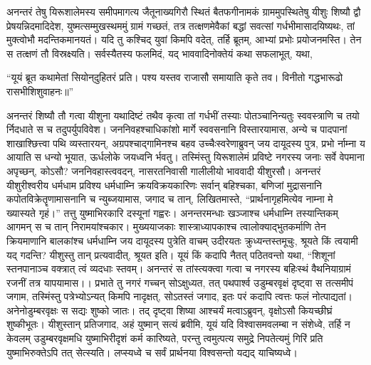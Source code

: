 \adhyAya
{}
\vakya अनन्तरं तेषु यिरूशालेमस्य समीपमागत्य जैतूनाख्यगिरौ स्थितं बैतफगीनामकं ग्राममुपस्थितेषु यीशुः शिष्यौ द्वौ प्रेषयन्निदमादिदेश,
\vakya युष्मत्सम्मुखस्थममुं ग्रामं गच्छतं, तत्र तत्क्षणमेवैकां बद्धां सवत्सां गर्धभीमासादयिष्यथः, तां मुक्त्वोभौ मदन्तिकमानयतं।
\vakya यदि तु कश्चिद् युवां किमपि वदेत्, तर्हि ब्रूतम्, आभ्यां प्रभोः प्रयोजनमस्ति। तेन स तत्क्षणं तौ विस्रक्ष्यति।
\vakya सर्वस्यैतस्य फलमिदं, यद् भाववादिनोक्तेयं कथा सफलाभूत्, यथा,
\begin{poem}
\startwithvakya “यूयं ब्रूत कथामेतां सियोन्‌दुहितरं प्रति।
\pline पश्य यस्तव राजासौ समायाति कृते तव।
\pline विनीतो गद्धभारूढो रासभीशिशुवाहनः॥”
\end{poem}
\vakya अनन्तरं शिष्यौ तौ गत्वा यीशुना यथादिष्टं तथैव कृत्वा
\vakya तां गर्धभीं तस्याः पोतञ्चानिन्यतुः स्ववस्त्राणि च तयो र्निदधाते स च तदुपर्युपविवेश।
\vakya जननिवहश्चाधिकांशो मार्गे स्ववसनानि विस्तारयामास, अन्ये च पादपानां शाखाश्छित्त्वा पथि व्यस्तारयन्,
\vakya अग्रपश्चाद्गामिनश्च बहव उच्चैःस्वरेणाब्रुवन् जय दायूदस्य पुत्र, प्रभो र्नाम्ना य आयाति स धन्यो भूयात, ऊर्धलोके जयध्वनि र्भवतु।
\vakya तस्मिंस्तु यिरूशालेमं प्रविष्टे नगरस्य जनाः सर्वे वेपमाना अपृच्छन्, कोऽसौ?
\vakya जननिवहास्त्ववदन्, नासरतनिवासी गालीलीयो भाववादी यीशुरसौ।
\vakya अनन्तरं यीशुरीश्वरीय धर्मधाम प्रविश्य धर्मधाम्नि क्रयविक्रयकारिणः सर्वान् बहिश्चका, बणिजां मुद्रासनानि कपोतविक्रेतॄणामासनानि च न्युब्जयामास,
\vakya जगाद च तान्, लिखितमास्ते, “प्रार्थनागृहमित्येव नाम्ना मे ख्यास्यते गृहं।” तत्तु युष्माभिरकारि दस्यूनां गह्वरः।
\vakya अनन्तरमन्धाः खञ्जाश्च धर्मधाम्नि तस्यान्तिकम् आगमन् स च तान् निरामयांश्चकार।
\vakya मुख्ययाजकाः शास्त्राध्यापकाश्च त्वालोक्याद्भुतकर्माणि तेन क्रियमाणानि बालकांश्च धर्मधाम्नि जय दायूदस्य पुत्रेति वाचम् उदीरयतः क्रुध्यन्तस्तमूचुः, श्रूयते किं त्वयामी यद् गदन्ति? 
\vakya यीशुस्तु तान् प्रत्यवादीत्, श्रूयत इति। यूयं किं कदापि नैतत् पठितवन्तो यथा, “शिशूनां स्तनपानाञ्च वक्त्रात् त्वं व्यदधाः स्तवम्।
\vakya अनन्तरं स तांस्त्यक्त्वा गत्वा च नगरस्य बहिःस्थं वैथनियाग्रामं रजनीं तत्र यापयामास।।
\vakya प्रभाते तु नगरं गच्चन् सोऽक्षुध्यत, तत् पथपार्श्व उडुम्बरवृक्षं दृष्ट्वा स तत्समीपं जगाम,
\vakya तस्मिंस्तु पत्रेभ्योऽन्यत् किमपि नादृक्षत्, सोऽतस्तं जगाद, इतः परं कदापि त्वत्तः फलं नोत्पाद्यतां। अनेनोडुम्बरवृक्षः स सद्यः शुष्को जातः।
\vakya तद् दृष्ट्वा शिष्या आश्चर्यं मत्वाऽब्रुवन्, वृक्षोऽसौ कियच्छीघ्रं शुष्कीभूतः।
\vakya यीशुस्तान् प्रतिजगाद, अहं युष्मान् सत्यं ब्रवीमि, यूयं यदि विश्वासमवलम्बा न संशेध्वे, तर्हि न केवलम् उडुम्बरवृक्षमधि युष्माभिरीदृशं कर्म कारिष्यते, परन्तु त्वमुत्पत्य समुद्रे निपतेत्यमुं गिरिं प्रति युष्माभिरुक्तेऽपि तत् सेत्स्यति।
\vakya लप्स्यध्वे च सर्वं प्रार्थनया विश्वसन्तो यद्यद् याचिष्यध्वे।
